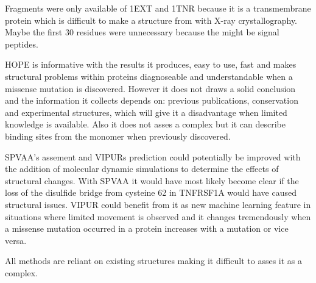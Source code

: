 Fragments were only available of 1EXT and 1TNR because it is a transmembrane protein which is difficult to make a structure from with X-ray crystallography.
Maybe the first 30 residues were unnecessary because the might be signal peptides. 

HOPE is informative with the results it produces, easy to use, fast and makes structural problems within proteins diagnoseable and understandable when a missense mutation is discovered. However it does not draws a solid conclusion and the information it collects depends on: previous publications, conservation and experimental structures, which will give it a disadvantage when limited knowledge is available. Also it does not asses a complex but it can describe binding sites from the monomer when previously discovered.


SPVAA's assement and VIPURs prediction could potentially be improved with the addition of molecular dynamic simulations to determine the effects of structural changes. With SPVAA it would have most likely become clear if the loss of the disulfide bridge from cysteine 62 in TNFRSF1A would have caused structural issues. VIPUR could benefit from it as new machine learning feature in situations where limited movement is observed and it changes tremendously when a missense mutation occurred in a protein increases with a mutation or vice versa.



All methods are reliant on existing structures making it difficult to asses it as a complex.
